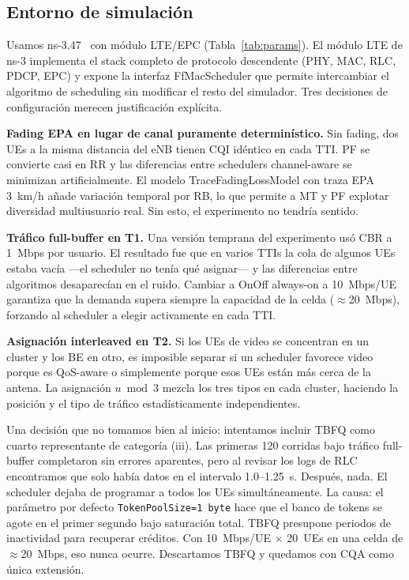 \documentclass[conference]{IEEEtran}
\begin{document}
\subsection{Entorno de simulación}

Usamos ns-3.47~\cite{ns3sim} con módulo LTE/EPC (Tabla~\ref{tab:params}).
El módulo LTE de ns-3 implementa el stack completo de protocolo descendente (PHY,
MAC, RLC, PDCP, EPC) y expone la interfaz FfMacScheduler que permite intercambiar
el algoritmo de scheduling sin modificar el resto del simulador. Tres decisiones de
configuración merecen justificación explícita.

\textbf{Fading EPA en lugar de canal puramente determinístico.} Sin fading, dos UEs
a la misma distancia del eNB tienen CQI idéntico en cada TTI. PF se convierte casi
en RR y las diferencias entre schedulers channel-aware se minimizan artificialmente.
El modelo TraceFadingLossModel con traza EPA 3~km/h añade variación temporal por RB,
lo que permite a MT y PF explotar diversidad multiusuario real. Sin esto, el experimento
no tendría sentido.

\textbf{Tráfico full-buffer en T1.} Una versión temprana del experimento usó CBR a
1~Mbps por usuario. El resultado fue que en varios TTIs la cola de algunos UEs estaba
vacía ---el scheduler no tenía qué asignar--- y las diferencias entre algoritmos
desaparecían en el ruido. Cambiar a OnOff always-on a 10~Mbps/UE garantiza que la
demanda supera siempre la capacidad de la celda ($\approx$20~Mbps), forzando al
scheduler a elegir activamente en cada TTI.

\textbf{Asignación interleaved en T2.} Si los UEs de video se concentran en un cluster
y los BE en otro, es imposible separar si un scheduler favorece video porque es QoS-aware
o simplemente porque esos UEs están más cerca de la antena. La asignación $u \bmod 3$
mezcla los tres tipos en cada cluster, haciendo la posición y el tipo de tráfico
estadísticamente independientes.

Una decisión que no tomamos bien al inicio: intentamos incluir TBFQ como cuarto
representante de categoría (iii). Las primeras 120 corridas bajo tráfico full-buffer
completaron sin errores aparentes, pero al revisar los logs de RLC encontramos que
solo había datos en el intervalo 1.0--1.25~s. Después, nada. El scheduler dejaba de
programar a todos los UEs simultáneamente. La causa: el parámetro por defecto
\texttt{TokenPoolSize=1~byte} hace que el banco de tokens se agote en el primer
segundo bajo saturación total. TBFQ presupone periodos de inactividad para recuperar
créditos. Con 10~Mbps/UE $\times$ 20~UEs en una celda de $\approx$20~Mbps, eso
nunca ocurre. Descartamos TBFQ y quedamos con CQA como única extensión.
\end{document}
